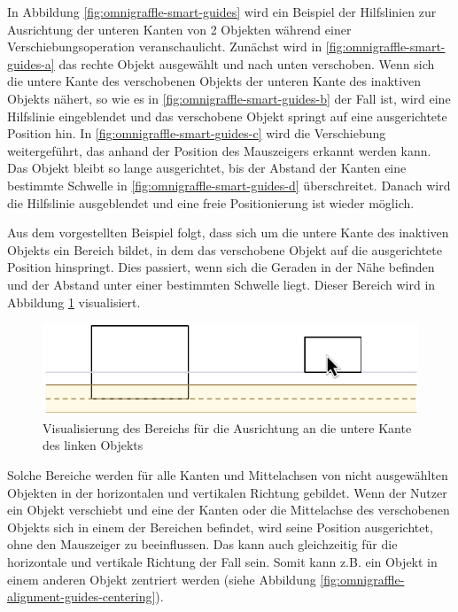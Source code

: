 In Abbildung \ref{fig:omnigraffle-smart-guides} wird ein Beispiel der Hilfslinien zur Ausrichtung der unteren Kanten von 2 Objekten während einer Verschiebungsoperation veranschaulicht. Zunächst wird in \ref{fig:omnigraffle-smart-guides-a} das rechte Objekt ausgewählt und nach unten verschoben. Wenn sich die untere Kante des verschobenen Objekts der unteren Kante des inaktiven Objekts nähert, so wie es in \ref{fig:omnigraffle-smart-guides-b} der Fall ist, wird eine Hilfslinie eingeblendet und das verschobene Objekt springt auf eine ausgerichtete Position hin. In \ref{fig:omnigraffle-smart-guides-c} wird die Verschiebung weitergeführt, das anhand der Position des Mauszeigers erkannt werden kann. Das Objekt bleibt so lange ausgerichtet, bis der Abstand der Kanten eine bestimmte Schwelle in \ref{fig:omnigraffle-smart-guides-d} überschreitet. Danach wird die Hilfslinie ausgeblendet und eine freie Positionierung ist wieder möglich.

Aus dem vorgestellten Beispiel folgt, dass sich um die untere Kante des inaktiven Objekts ein Bereich bildet, in dem das verschobene Objekt auf die ausgerichtete Position hinspringt. Dies passiert, wenn sich die Geraden in der Nähe befinden und der Abstand unter einer bestimmten Schwelle liegt. Dieser Bereich wird in Abbildung \ref{fig:omnigraffle-smart-guides-snap-area} visualisiert.

\begin{figure}[hbt]
    \centering
    \includegraphics{resources/omnigraffle-smart-guides-snap-area}
    \caption{Visualisierung des Bereichs für die Ausrichtung an die untere Kante des linken Objekts}
    \label{fig:omnigraffle-smart-guides-snap-area}
\end{figure}

Solche Bereiche werden für alle Kanten und Mittelachsen von nicht ausgewählten Objekten in der horizontalen und vertikalen Richtung gebildet. Wenn der Nutzer ein Objekt verschiebt und eine der Kanten oder die Mittelachse des verschobenen Objekts sich in einem der Bereichen befindet, wird seine Position ausgerichtet, ohne den Mauszeiger zu beeinflussen. Das kann auch gleichzeitig für die horizontale und vertikale Richtung der Fall sein. Somit kann z.B. ein Objekt in einem anderen Objekt zentriert werden (siehe Abbildung \ref{fig:omnigraffle-alignment-guides-centering}).

